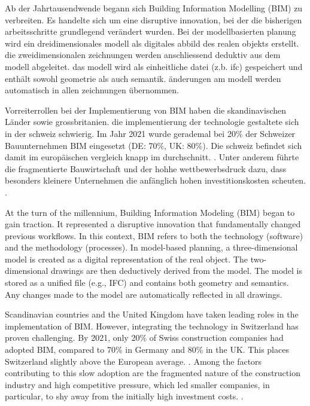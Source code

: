 \begin{German}
    Ab der Jahrtausendwende begann sich Building Information Modelling (BIM) zu verbreiten. Es handelte sich um eine disruptive innovation, bei der die bisherigen arbeitsschritte grundlegend verändert wurden. Bei der modellbasierten planung wird ein dreidimensionales modell als digitales abbild des realen objekts erstellt. die zweidimensionalen zeichnungen werden anschliessend deduktiv aus dem modell abgeleitet. das modell wird als einheitliche datei (z.b. ifc) gespeichert und enthält sowohl geometrie als auch semantik. änderungen am modell werden automatisch in allen zeichnungen übernommen.

    Vorreiterrollen bei der Implementierung von BIM haben die skandinavischen Länder sowie grossbritanien. die implementierung der technologie gestaltete sich in der schweiz schwierig. Im Jahr 2021 wurde gerademal bei 20\% der Schweizer Bauunternehmen BIM eingesetzt (DE: 70\%, UK: 80\%). Die schweiz befindet sich damit im europäischen vergleich knapp im durchschnitt. \cite{heinrichSchweizImBIMEuropavergleich2022}. Unter anderem führte die fragmentierte Bauwirtschaft und der hohhe wettbewerbsdruck dazu, dass besonders kleinere Unternehmen die anfänglich hohen investitionskosten scheuten. \cite{ivanicErfolgreicheEinfuehrungBuilding2020}.
\end{German}

\begin{English}
    At the turn of the millennium, Building Information Modeling (BIM) began to gain traction. It represented a disruptive innovation that fundamentally changed previous workflows. In this context, BIM refers to both the technology (software) and the methodology (processes). In model-based planning, a three-dimensional model is created as a digital representation of the real object. The two-dimensional drawings are then deductively derived from the model. The model is stored as a unified file (e.g., IFC) and contains both geometry and semantics. Any changes made to the model are automatically reflected in all drawings.

    Scandinavian countries and the United Kingdom have taken leading roles in the implementation of BIM. However, integrating the technology in Switzerland has proven challenging. By 2021, only 20\% of Swiss construction companies had adopted BIM, compared to 70\% in Germany and 80\% in the UK. This places Switzerland slightly above the European average. \cite{heinrichSchweizImBIMEuropavergleich2022}. Among the factors contributing to this slow adoption are the fragmented nature of the construction industry and high competitive pressure, which led smaller companies, in particular, to shy away from the initially high investment costs. \cite{ivanicErfolgreicheEinfuehrungBuilding2020}. \
\end{English}

